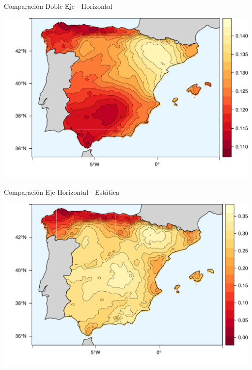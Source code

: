 \documentclass[xcolor={usenames,svgnames,dvipsnames}]{beamer}
\begin{document}
\begin{frame}[label={sec:org2cd264d}]{Comparación Doble Eje - Horizontal}
\begin{center}
\includegraphics[width=.9\linewidth]{../figs/TwoHoriz.pdf}
\end{center}
\end{frame}



\begin{frame}[label={sec:org46a4f03}]{Comparación Eje Horizontal - Estática}
\begin{center}
\includegraphics[width=.9\linewidth]{../figs/HorizFixed.pdf}
\end{center}
\end{frame}
\end{document}
